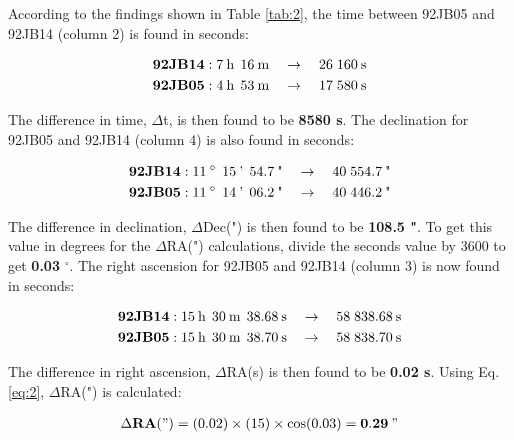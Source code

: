 \documentclass[12pt]{article}
\begin{document}
According to the findings shown in Table \ref{tab:2}, the time between 92JB05 and 92JB14 (column 2) is found in seconds:

\vspace{-2ex}
\begin{align*}
    \text{\textbf{92JB14}} : 7 \: \text{h} \:\: 16 \: \text{m} \quad \rightarrow \quad 26 \; 160 \: \text{s} \\
    \text{\textbf{92JB05}} : 4 \: \text{h} \:\: 53 \: \text{m} \quad \rightarrow \quad 17 \; 580 \: \text{s}
\end{align*}

The difference in time, $\Delta$t, is then found to be \textbf{8580 s}. The declination for 92JB05 and 92JB14 (column 4) is also found in seconds:

\vspace{-2ex}
\begin{align*}
    \text{\textbf{92JB14}} : 11 \: ^{\circ} \:\: 15 \: \text{'} \:\: 54.7 \: \text{"} \quad \rightarrow \quad 40 \; 554.7 \: \text{"} \\
    \text{\textbf{92JB05}} : 11 \: ^{\circ} \:\: 14 \: \text{'} \:\: 06.2 \: \text{"} \quad \rightarrow \quad 40 \; 446.2 \: \text{"}
\end{align*}

The difference in declination, $\Delta$Dec(") is then found to be \textbf{108.5 "}. To get this value in degrees for the $\Delta$RA(") calculations, divide the seconds value by 3600 to get \textbf{0.03} $^{\circ}$.
The right ascension for 92JB05 and 92JB14 (column 3) is now found in seconds:

\vspace{-2ex}
\begin{align*}
    \text{\textbf{92JB14}} : 15 \: \text{h} \:\: 30 \: \text{m} \:\: 38.68 \: \text{s} \quad \rightarrow \quad 58 \; 838.68 \: \text{s} \\
    \text{\textbf{92JB05}} : 15 \: \text{h} \:\: 30 \: \text{m} \:\: 38.70 \: \text{s} \quad \rightarrow \quad 58 \; 838.70 \: \text{s}
\end{align*}

The difference in right ascension, $\Delta$RA(s) is then found to be \textbf{0.02 s}. Using Eq. \ref{eq:2}, $\Delta$RA(") is calculated:

\vspace{-2ex}
\begin{gather*}
    \Delta \textbf{RA} (") = (0.02) \times (15) \times \cos (0.03) = \mathbf{0.29} \: "
\end{gather*}
\end{document}
